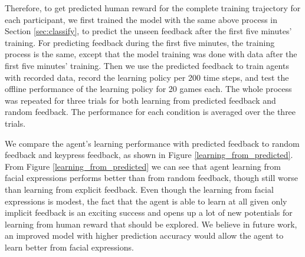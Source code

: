\documentclass[10pt,journal,compsoc]{IEEEtran}
\begin{document}
Therefore, to get predicted human reward for the complete training trajectory for each participant, we first trained the model with the same above process in Section \ref{sec:classify}, to predict the unseen feedback after the first five minutes' training. For predicting feedback during the first five minutes, the training process is the same, except that the model training was done with data after the first five minutes' training. Then we use the predicted feedback to train agents with recorded data, record the learning policy per 200 time steps, and test the offline performance of the learning policy for 20 games each. The whole process was repeated for three trials for both learning from predicted feedback and random feedback. The performance for each condition is averaged over the three trials. %

We compare the agent's learning performance with predicted feedback to random feedback and keypress feedback, as shown in Figure \ref{learning_from_predicted}. From Figure \ref{learning_from_predicted} we can see that agent learning from facial expressions performs better than from random feedback, though still worse than learning from explicit feedback. Even though the learning from facial expressions is modest, the fact that the agent is able to learn at all given only implicit feedback is an exciting success and opens up a lot of new potentials for learning from human reward that should be explored. We believe in future work, an improved model with higher prediction accuracy would allow the agent to learn better from facial expressions.



\end{document}
